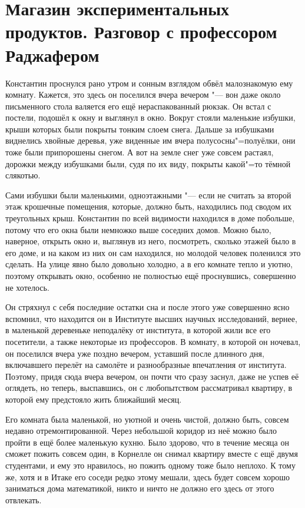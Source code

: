 \section[Магазин экспериментальных продуктов]
{Магазин экспериментальных продуктов. Разговор с профессором Раджафером}

Константин проснулся рано утром и сонным взглядом обвёл малознакомую ему комнату.
Кажется, это здесь он поселился вчера вечером "--- вон даже около письменного
стола валяется его ещё нераспакованный рюкзак.
Он встал с постели, подошёл к окну и выглянул в окно.
Вокруг стояли маленькие избушки, крыши которых были покрыты тонким слоем снега.
Дальше за избушками виднелись хвойные деревья, уже виденные им вчера
полусосны"=полуёлки, они тоже были припорошены снегом.
А вот на земле снег уже совсем растаял, дорожки между избушками были, судя по их
виду, покрыты какой"=то тёмной слякотью.

Сами избушки были маленькими, одноэтажными "--- если не считать за второй этаж
крошечные помещения, которые, должно быть, находились под сводом их треугольных
крыш.
Константин по всей видимости находился в доме побольше, потому что его окна были
немножко выше соседних домов.
Можно было, наверное, открыть окно и, выглянув из него, посмотреть, сколько
этажей было в его доме, и на каком из них он сам находился, но молодой человек
поленился это сделать.
На улице явно было довольно холодно, а в его комнате тепло и уютно, поэтому
открывать окно, особенно не полностью ещё проснувшись, совершенно не хотелось.

Он стряхнул с себя последние остатки сна и после этого уже совершенно ясно
вспомнил, что находится он в Институте высших научных исследований, вернее, в
маленькой деревеньке неподалёку от института, в которой жили все его посетители,
а также некоторые из профессоров.
В комнату, в которой он ночевал, он поселился вчера уже поздно вечером, уставший
после длинного дня, включавшего перелёт на самолёте и разнообразные впечатления
от института.
Поэтому, придя сюда вчера вечером, он почти что сразу заснул, даже не успев её
оглядеть, но теперь, выспавшись, он с любопытством рассматривал квартиру, в
которой ему предстояло жить ближайший месяц.

Его комната была маленькой, но уютной и очень чистой, должно быть, совсем
недавно отремонтированной.
Через небольшой коридор из неё можно было пройти в ещё более маленькую кухню.
Было здорово, что в течение месяца он сможет пожить совсем один, в Корнелле он
снимал квартиру вместе с ещё двумя студентами, и ему это нравилось, но пожить
одному тоже было неплохо.
К тому же, хотя и в Итаке его соседи редко этому мешали, здесь будет совсем
хорошо заниматься дома математикой, никто и ничто не должно его здесь от этого
отвлекать.

